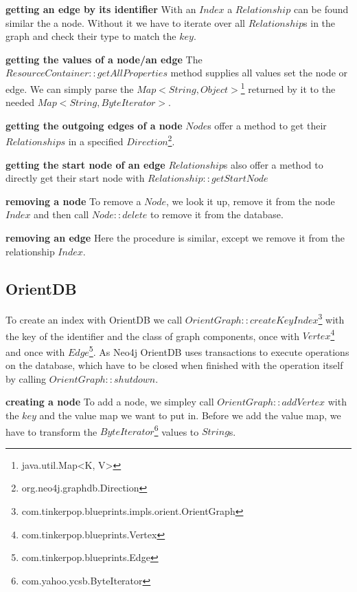 \textbf{getting an edge by its identifier} \newline
With an $ Index $ a $ Relationship $ can be found similar the a node.
Without it we have to iterate over all $ Relationship $s in the graph and check their type to match the $ key $.

\textbf{getting the values of a node/an edge} \newline
The $ ResourceContainer::getAllProperties $ method supplies all values set the node or edge.
We can simply parse the $ Map<String, Object> $\footnote{java.util.Map<K, V>} returned by it to the needed $ Map<String, ByteIterator> $.

\textbf{getting the outgoing edges of a node} \newline
$ Node $s offer a method to get their $ Relationships $ in a specified $ Direction $\footnote{org.neo4j.graphdb.Direction}.

\textbf{getting the start node of an edge} \newline
$ Relationship $s also offer a method to directly get their start node with $ Relationship::getStartNode $

\textbf{removing a node} \newline
To remove a $ Node $,
we look it up,
remove it from the node $ Index $ and then call $ Node::delete $ to remove it from the database.

\textbf{removing an edge} \newline
Here the procedure is similar,
except we remove it from the relationship $ Index $.

\subsection{OrientDB}
To create an index with OrientDB we call $ OrientGraph::createKeyIndex $\footnote{com.tinkerpop.blueprints.impls.orient.OrientGraph} with the key of the identifier and the class of graph components,
once with $ Vertex $\footnote{com.tinkerpop.blueprints.Vertex} and once with $ Edge $\footnote{com.tinkerpop.blueprints.Edge}.
As Neo4j OrientDB uses transactions to execute operations on the database,
which have to be closed when finished with the operation itself by calling $ OrientGraph::shutdown $.

\textbf{creating a node} \newline
To add a node,
we simpley call $ OrientGraph::addVertex $ with the $ key $ and the value map we want to put in.
Before we add the value map,
we have to transform the $ ByteIterator $\footnote{com.yahoo.ycsb.ByteIterator} values to $ String $s.

